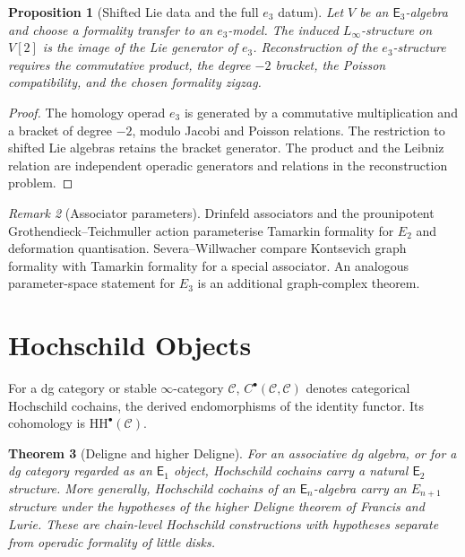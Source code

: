 \documentclass[11pt]{amsart}
\newtheorem{theorem}{Theorem}[section]
\newtheorem{proposition}[theorem]{Proposition}
\theoremstyle{definition}
\theoremstyle{remark}
\newtheorem{remark}[theorem]{Remark}
\providecommand{\En}{\mathsf{E}_n}
\providecommand{\Etwo}{\mathsf{E}_2}
\providecommand{\Ethree}{\mathsf{E}_3}
\providecommand{\Eone}{\mathsf{E}_1}
\providecommand{\cC}{\mathcal{C}}
\providecommand{\HH}{\mathrm{HH}}
\providecommand{\Linf}{L_\infty}
\begin{document}
\begin{proposition}[Shifted Lie data and the full $e_3$ datum]
\label{prop:lie-part-e3}
Let $V$ be an $\Ethree$-algebra and choose a formality transfer to an
$e_3$-model. The induced $\Linf$-structure on $V[2]$ is the image of the
Lie generator of $e_3$. Reconstruction of the $e_3$-structure requires
the commutative product, the degree $-2$ bracket, the Poisson
compatibility, and the chosen formality zigzag.
\end{proposition}

\begin{proof}
The homology operad $e_3$ is generated by a commutative multiplication
and a bracket of degree $-2$, modulo Jacobi and Poisson relations. The
restriction to shifted Lie algebras retains the bracket generator. The
product and the Leibniz relation are independent operadic generators and
relations in the reconstruction problem.
\end{proof}

\begin{remark}[Associator parameters]
\label{rem:associator-parameters}
Drinfeld associators and the prounipotent Grothendieck--Teichmuller
action parameterise Tamarkin formality for $E_2$ and deformation
quantisation. Severa--Willwacher compare Kontsevich graph formality with
Tamarkin formality for a special associator. An analogous
parameter-space statement for $E_3$ is an additional graph-complex
theorem.
\end{remark}

\section{Hochschild Objects}
\label{sec:hochschild-objects}

For a dg category or stable $\infty$-category $\cC$,
$C^\bullet(\cC,\cC)$ denotes categorical Hochschild cochains, the
derived endomorphisms of the identity functor. Its cohomology is
$\HH^\bullet(\cC)$.

\begin{theorem}[Deligne and higher Deligne]
\label{thm:deligne-higher}
For an associative dg algebra, or for a dg category regarded as an
$\Eone$ object, Hochschild cochains carry a natural $\Etwo$ structure.
More generally, Hochschild cochains of an $\En$-algebra carry an
$E_{n+1}$ structure under the hypotheses of the higher Deligne theorem
of Francis and Lurie. These are chain-level Hochschild constructions
with hypotheses separate from operadic formality of little disks.
\end{theorem}
\end{document}
